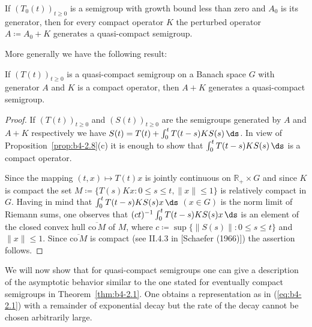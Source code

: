 	If $(T_{0}(t))_{t \geq 0}$ is a semigroup with growth bound less than zero and $A_{0}$ is its generator, then for every compact operator $K$ the perturbed operator $A \coloneqq A_{0} + K$ generates a quasi-compact semigroup.
	
	More generally we have the following result:
	\begin{proposition}\label{prop:b4-2.9}
		If $(T(t))_{t \geq 0}$ is a quasi-compact semigroup on a Banach space $G$ with generator $A$ and $K$ is a compact operator, then $A + K$ generates a quasi-compact semigroup.
	\end{proposition}
\begin{proof}
	If $(T(t))_{t \geq 0}$ and $(S(t))_{t \geq 0}$ are the semigroups generated by $A$ and $A + K$ respectively we have $S(t) = T(t) + \int_0^t T(t-s)KS(s) \,\ds$.
	In view of Proposition~\ref{prop:b4-2.8}(c) it is enough to show that $\int_0^t T(t-s)KS(s) \,\ds$ is a compact operator.
	
	Since the mapping $(t,x) \mapsto T(t)x$ is jointly continuous on $\mathbb{R}_+ \times G$ and since $K$ is compact the set $M \coloneq \{T(s)Kx \colon 0 \leq s \leq t, \|x\| \leq 1\}$ is relatively compact in $G$. Having in mind that $\int_0^t T(t-s)KS(s)x \,\ds$ $(x \in G)$ is the norm limit of Riemann sums, one observes that 
	$(ct)^{-1}\int_0^t T(t-s)KS(s)x \,\ds$ is an element of the closed convex hull
	 $\overline{\mathrm{co}\, M}$ of $M$, where $c \coloneq \sup \{\|S(s)\| \colon 0 \leq s \leq t\}$ and $\|x\| \leq 1$. Since $\overline{\mathrm{co\,} M}$ is compact (see II.4.3 in [Schaefer (1966)]) the assertion follows.
\end{proof}
%
%
\newpage 
%
%
We will now show that for quasi-compact semigroups one can give a description of the asymptotic behavior similar to the one stated for eventually compact semigroups in Theorem~\ref{thm:b4-2.1}. One obtains a representation as in (\ref{eq:b4-2.1}) with a remainder of exponential decay but the rate of the decay cannot be chosen arbitrarily large.
